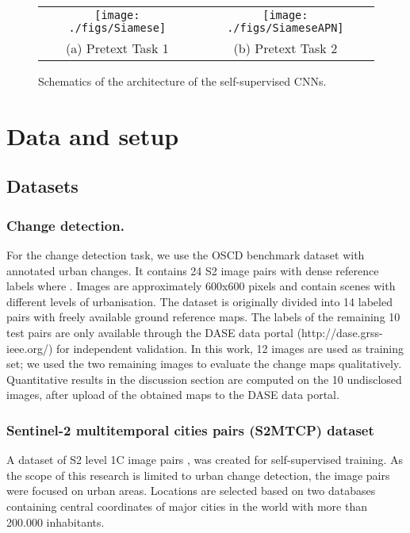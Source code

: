 \documentclass[runningheads]{llncs}
\begin{document}
\begin{figure}
    \centering
\begin{tabular}{cc}
    \texttt{[image: ./figs/Siamese]} &
    \texttt{[image: ./figs/SiameseAPN]} \\
    (a) Pretext Task 1 & (b) Pretext Task 2 \\
    \end{tabular}
    \caption{Schematics of the architecture of the self-supervised CNNs.}
    
    \label{fig:siamese}
\end{figure}

\section{Data and setup}


\subsection{Datasets}
\subsubsection{Change detection.}\label{sec:datal} For the change detection task, we use the OSCD benchmark dataset \cite{Daudt:2018:OSCD_CD_dataset} with annotated urban changes. It contains 24 S2 image pairs with dense reference labels  where . Images are approximately 600x600 pixels and contain scenes with different levels of urbanisation. The dataset is originally divided into 14 labeled pairs with freely available ground reference maps. The labels of the remaining  10 test pairs are only available through the DASE data portal (http://dase.grss-ieee.org/) for independent validation. In this work, 12 images are used as training set; we used the two remaining images to evaluate the change maps qualitatively. Quantitative results in the discussion section are computed on the 10 undisclosed images, after upload of the obtained maps to the DASE data portal. 

\subsubsection{Sentinel-2 multitemporal cities pairs (S2MTCP) dataset} 
A dataset of  S2 level 1C image pairs , was created for self-supervised training. As the scope of this research is limited to urban change detection, the image pairs were focused on urban areas. Locations are selected based on two databases containing central coordinates of major cities in the world \cite{dataset_simplemaps,dataset_geonames} {with more} than 200.000 inhabitants. 
\end{document}
